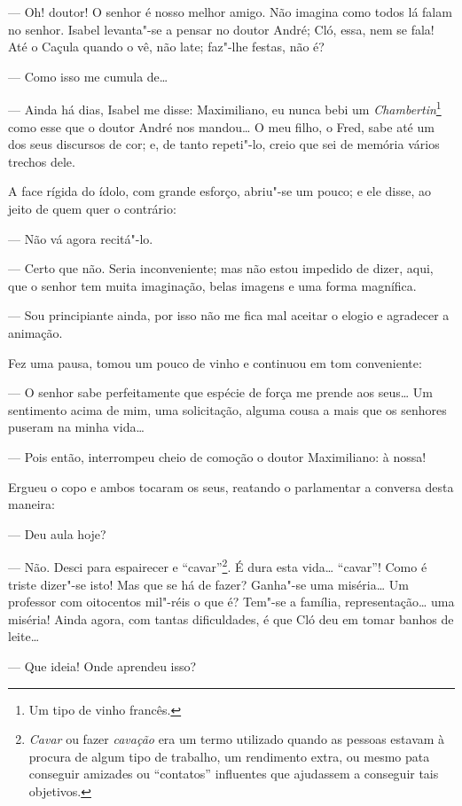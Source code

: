 --- Oh! doutor! O senhor é nosso melhor amigo. Não imagina como todos lá
falam no senhor. Isabel levanta"-se a pensar no doutor André; Cló, essa,
nem se fala! Até o Caçula quando o vê, não late; faz"-lhe festas, não é?

--- Como isso me cumula de\ldots{}

--- Ainda há dias, Isabel me disse: Maximiliano, eu nunca bebi um
\emph{Chambertin}\footnote{Um tipo de vinho francês.} como esse que o
doutor André nos mandou\ldots{} O meu filho, o Fred, sabe até um dos seus
discursos de cor; e, de tanto repeti"-lo, creio que sei de memória vários
trechos dele.

A face rígida do ídolo, com grande esforço, abriu"-se um pouco; e ele
disse, ao jeito de quem quer o contrário:

--- Não vá agora recitá"-lo.

--- Certo que não. Seria inconveniente; mas não estou impedido de dizer,
aqui, que o senhor tem muita imaginação, belas imagens e uma forma
magnífica.

--- Sou principiante ainda, por isso não me fica mal aceitar o elogio e
agradecer a animação.

Fez uma pausa, tomou um pouco de vinho e continuou em tom conveniente:

--- O senhor sabe perfeitamente que espécie de força me prende aos
seus\ldots{} Um sentimento acima de mim, uma solicitação, alguma cousa a mais
que os senhores puseram na minha vida\ldots{}

--- Pois então, interrompeu cheio de comoção o doutor Maximiliano: à
nossa!

Ergueu o copo e ambos tocaram os seus, reatando o parlamentar a conversa
desta maneira:

--- Deu aula hoje?

--- Não. Desci para espairecer e ``cavar''\footnote{\emph{Cavar} ou fazer
  \emph{cavação} era um termo utilizado quando as pessoas estavam à
  procura de algum tipo de trabalho, um rendimento extra, ou mesmo pata
  conseguir amizades ou ``contatos'' influentes que ajudassem a
  conseguir tais objetivos.}. É dura esta vida\ldots{} ``cavar''! Como é triste
dizer"-se isto! Mas que se há de fazer? Ganha"-se uma miséria\ldots{} Um
professor com oitocentos mil"-réis o que é? Tem"-se a família,
representação\ldots{} uma miséria! Ainda agora, com tantas dificuldades, é
que Cló deu em tomar banhos de leite\ldots{}

--- Que ideia! Onde aprendeu isso?

